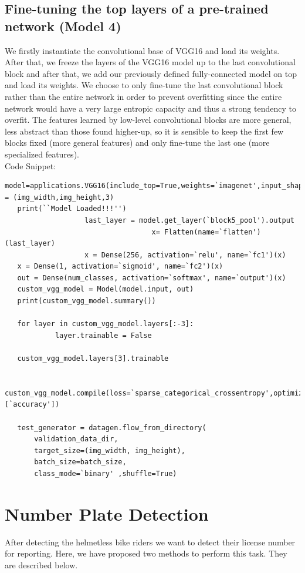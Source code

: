 \subsection{Fine-tuning the top layers of a pre-trained network (Model 4)}

\par We firstly instantiate the convolutional base of VGG16 and load its weights. After that, we freeze the layers of the VGG16 model up to the last convolutional block and after that, we add our previously defined fully-connected model on top and load its weights. We choose to only fine-tune the last convolutional block rather than the entire network in order to prevent overfitting since the entire network would have a very large entropic capacity and thus a strong tendency to overfit. The features learned by low-level convolutional blocks are more general, less abstract than those found higher-up, so it is sensible to keep the first few blocks fixed (more general features) and only fine-tune the last one (more specialized features).
\\Code Snippet:
\begin{lstlisting}[caption = Put some caption]
   model=applications.VGG16(include_top=True,weights=`imagenet',input_shape = (img_width,img_height,3)
   print(``Model Loaded!!!'')
                   last_layer = model.get_layer(`block5_pool').output
                                   x= Flatten(name=`flatten')(last_layer)
                   x = Dense(256, activation=`relu', name=`fc1')(x)
   x = Dense(1, activation=`sigmoid', name=`fc2')(x)
   out = Dense(num_classes, activation=`softmax', name=`output')(x)
   custom_vgg_model = Model(model.input, out)
   print(custom_vgg_model.summary())

   for layer in custom_vgg_model.layers[:-3]:
            layer.trainable = False

   custom_vgg_model.layers[3].trainable

   custom_vgg_model.compile(loss=`sparse_categorical_crossentropy',optimizer=`rmsprop',metrics=[`accuracy'])

   test_generator = datagen.flow_from_directory(
       validation_data_dir,
       target_size=(img_width, img_height),
       batch_size=batch_size,
       class_mode=`binary' ,shuffle=True)

\end{lstlisting}




\section{Number Plate Detection}
After detecting the helmetless bike riders we want to detect their license number for reporting. Here, we have proposed two methods to perform this task. They are described below.
